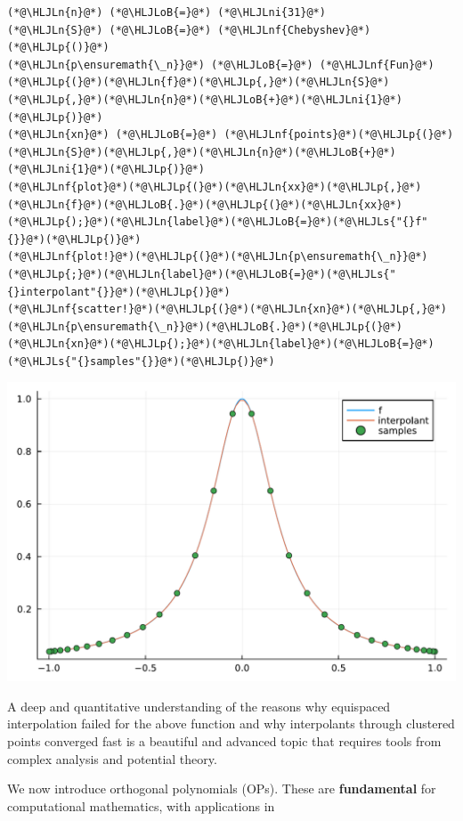 \documentclass[12pt,a4paper]{article}
\newcommand{\HLJLn}[1]{#1}
\newcommand{\HLJLnf}[1]{\textcolor[RGB]{66,102,213}{#1}}
\newcommand{\HLJLs}[1]{\textcolor[RGB]{201,61,57}{#1}}
\newcommand{\HLJLni}[1]{\textcolor[RGB]{59,151,46}{#1}}
\newcommand{\HLJLoB}[1]{\textcolor[RGB]{102,102,102}{\textbf{#1}}}
\newcommand{\HLJLp}[1]{#1}
\begin{document}
\begin{lstlisting}
(*@\HLJLn{n}@*) (*@\HLJLoB{=}@*) (*@\HLJLni{31}@*)
(*@\HLJLn{S}@*) (*@\HLJLoB{=}@*) (*@\HLJLnf{Chebyshev}@*)(*@\HLJLp{()}@*)
(*@\HLJLn{p\ensuremath{\_n}}@*) (*@\HLJLoB{=}@*) (*@\HLJLnf{Fun}@*)(*@\HLJLp{(}@*)(*@\HLJLn{f}@*)(*@\HLJLp{,}@*)(*@\HLJLn{S}@*)(*@\HLJLp{,}@*)(*@\HLJLn{n}@*)(*@\HLJLoB{+}@*)(*@\HLJLni{1}@*)(*@\HLJLp{)}@*) 
(*@\HLJLn{xn}@*) (*@\HLJLoB{=}@*) (*@\HLJLnf{points}@*)(*@\HLJLp{(}@*)(*@\HLJLn{S}@*)(*@\HLJLp{,}@*)(*@\HLJLn{n}@*)(*@\HLJLoB{+}@*)(*@\HLJLni{1}@*)(*@\HLJLp{)}@*) 
(*@\HLJLnf{plot}@*)(*@\HLJLp{(}@*)(*@\HLJLn{xx}@*)(*@\HLJLp{,}@*)(*@\HLJLn{f}@*)(*@\HLJLoB{.}@*)(*@\HLJLp{(}@*)(*@\HLJLn{xx}@*)(*@\HLJLp{);}@*)(*@\HLJLn{label}@*)(*@\HLJLoB{=}@*)(*@\HLJLs{"{}f"{}}@*)(*@\HLJLp{)}@*)
(*@\HLJLnf{plot!}@*)(*@\HLJLp{(}@*)(*@\HLJLn{p\ensuremath{\_n}}@*)(*@\HLJLp{;}@*)(*@\HLJLn{label}@*)(*@\HLJLoB{=}@*)(*@\HLJLs{"{}interpolant"{}}@*)(*@\HLJLp{)}@*)
(*@\HLJLnf{scatter!}@*)(*@\HLJLp{(}@*)(*@\HLJLn{xn}@*)(*@\HLJLp{,}@*)(*@\HLJLn{p\ensuremath{\_n}}@*)(*@\HLJLoB{.}@*)(*@\HLJLp{(}@*)(*@\HLJLn{xn}@*)(*@\HLJLp{);}@*)(*@\HLJLn{label}@*)(*@\HLJLoB{=}@*)(*@\HLJLs{"{}samples"{}}@*)(*@\HLJLp{)}@*)
\end{lstlisting}

\includegraphics[width=\linewidth]{jl_dOthw0/OP_methods_6_1.pdf}

A deep and quantitative understanding of the reasons why equispaced interpolation failed for the above function and why interpolants through clustered points converged fast is a beautiful and advanced topic that requires tools from complex analysis and potential theory.

We now introduce orthogonal polynomials (OPs). These are \textbf{fundamental} for computational mathematics, with applications in
\end{document}
